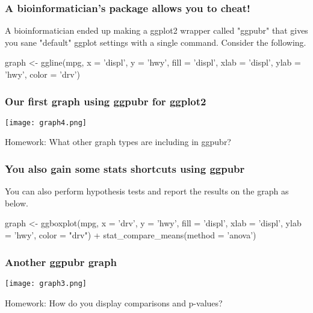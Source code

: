 \documentclass[aspectratio=169]{beamer}
\begin{document}
	\begin{frame}[fragile]
		\frametitle{A bioinformatician's package allows you to cheat!}
		
		A bioinformatician ended up making a ggplot2 wrapper called "ggpubr" that gives you sane "default" ggplot settings with a single command. Consider the following.
		
		\begin{semiverbatim}
        graph <- ggline(mpg, x = 'displ', y = 'hwy', fill = 'displ', 
        xlab = 'displ', ylab = 'hwy', color = 'drv')
		\end{semiverbatim}
		
	\end{frame}

	\begin{frame}[fragile]
		\frametitle{Our first graph using ggpubr for ggplot2}
		
		\begin{center}
			\texttt{[image: graph4.png]}
		\end{center}
	
		Homework: What other graph types are including in ggpubr?
		
	\end{frame}

	\begin{frame}[fragile]
		\frametitle{You also gain some stats shortcuts using ggpubr}
		
		You can also perform hypothesis tests and report the results on the graph as below.
		
		\begin{semiverbatim}
        graph <- ggboxplot(mpg, x = 'drv', y = 'hwy', fill = 'displ',
        xlab = 'displ', ylab = 'hwy', color = "drv") 
        + stat_compare_means(method = 'anova')
		\end{semiverbatim}
		
	\end{frame}

		\begin{frame}[fragile]
		\frametitle{Another ggpubr graph}
		
		\begin{center}
			\texttt{[image: graph3.png]}
		\end{center}
		
		Homework: How do you display comparisons and p-values?
		
	\end{frame}
\end{document}
